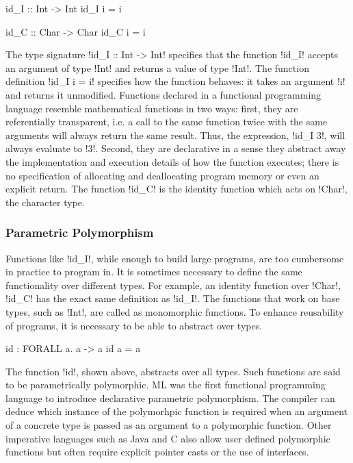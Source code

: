 \documentclass[manuscript,screen,nonacm]{acmart}
\begin{document}
\begin{minipage}{0.5\linewidth}
\begin{code}
id_I :: Int -> Int
id_I i = i
\end{code}
\end{minipage}%
\begin{minipage}{0.5\linewidth}
\begin{code}
id_C :: Char -> Char
id_C i = i
\end{code}
\end{minipage}

The type signature !id_I :: Int -> Int! specifies that the function !id_I! accepts an argument of type !Int! and returns a value of type !Int!. The function definition !id_I i = i! specifies how the function behaves: it takes an argument !i! and returns it unmodified. Functions declared in a functional programming language resemble mathematical functions in two ways: first, they are referentially transparent, i.e.  a call to the same function twice with the same arguments will always return the same result. Thus, the expression, !id_I 3!, will always evaluate to !3!. Second, they are declarative in a sense they abstract away the implementation and execution details of how the function executes; there is no specification of allocating and deallocating program memory or even an explicit return. The function !id_C! is the identity function which acts on !Char!, the character type.

\subsubsection{Parametric Polymorphism}
Functions like !id_I!, while enough to build large programs, are too cumbersome in practice to program in. It is sometimes necessary to define the same functionality over different types. For example, an identity function over !Char!, !id_C! has the exact same definition as !id_I!. The functions that work on base types, such as !Int!, are called as monomorphic functions. To enhance reusability of programs, it is necessary to be able to abstract over types.

\begin{CenteredBox}
\begin{code}
id : FORALL a. a -> a
id a = a
\end{code}
\end{CenteredBox}
The function !id!, shown above, abstracts over all types. Such functions are said to be parametrically polymorphic\cite{strachey_fundamental_2000}. ML\cite{milner_logic_1975, milner_theory_1978} was the first functional programming language to introduce declarative parametric polymorphism. The compiler can deduce which instance of the polymorhpic function is required when an argument of a concrete type is passed as an argument to a polymorphic function. Other imperative languages such as Java and C also allow user defined polymorphic functions but often require explicit pointer casts or the use of interfaces.
\end{document}
